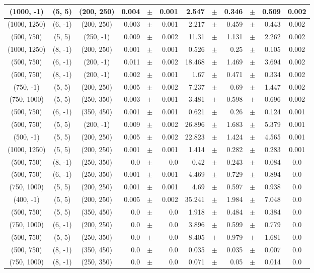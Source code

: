 \documentclass[12pt]{paper}
\begin{document}
\begin{table}[ht]
\begin{center}
{\begin{tabular}{|c|c|c|rrr|rrrrr|c|}
(1000, -1)&(5, 5)&(200, 250)&0.004&$\pm$&0.001&2.547&$\pm$&0.346&$\pm$&0.509&0.002\\\hline
(1000, 1250)&(6, -1)&(200, 250)&0.003&$\pm$&0.001&2.217&$\pm$&0.459&$\pm$&0.443&0.002\\\hline
(500, 750)&(5, 5)&(250, -1)&0.009&$\pm$&0.002&11.31&$\pm$&1.131&$\pm$&2.262&0.002\\\hline
(1000, 1250)&(8, -1)&(200, 250)&0.001&$\pm$&0.001&0.526&$\pm$&0.25&$\pm$&0.105&0.002\\\hline
(500, 750)&(6, -1)&(200, -1)&0.011&$\pm$&0.002&18.468&$\pm$&1.469&$\pm$&3.694&0.002\\\hline
(500, 750)&(8, -1)&(200, -1)&0.002&$\pm$&0.001&1.67&$\pm$&0.471&$\pm$&0.334&0.002\\\hline
(750, -1)&(5, 5)&(200, 250)&0.005&$\pm$&0.002&7.237&$\pm$&0.69&$\pm$&1.447&0.002\\\hline
(750, 1000)&(5, 5)&(250, 350)&0.003&$\pm$&0.001&3.481&$\pm$&0.598&$\pm$&0.696&0.002\\\hline
(500, 750)&(6, -1)&(350, 450)&0.001&$\pm$&0.001&0.621&$\pm$&0.26&$\pm$&0.124&0.001\\\hline
(500, 750)&(5, 5)&(200, -1)&0.009&$\pm$&0.002&26.896&$\pm$&1.683&$\pm$&5.379&0.001\\\hline
(500, -1)&(5, 5)&(200, 250)&0.005&$\pm$&0.002&22.823&$\pm$&1.424&$\pm$&4.565&0.001\\\hline
(1000, 1250)&(5, 5)&(200, 250)&0.001&$\pm$&0.001&1.414&$\pm$&0.282&$\pm$&0.283&0.001\\\hline
(500, 750)&(8, -1)&(250, 350)&0.0&$\pm$&0.0&0.42&$\pm$&0.243&$\pm$&0.084&0.0\\\hline
(500, 750)&(6, -1)&(250, 350)&0.001&$\pm$&0.001&4.469&$\pm$&0.729&$\pm$&0.894&0.0\\\hline
(750, 1000)&(5, 5)&(200, 250)&0.001&$\pm$&0.001&4.69&$\pm$&0.597&$\pm$&0.938&0.0\\\hline
(400, -1)&(5, 5)&(200, 250)&0.005&$\pm$&0.002&35.241&$\pm$&1.984&$\pm$&7.048&0.0\\\hline
(500, 750)&(5, 5)&(350, 450)&0.0&$\pm$&0.0&1.918&$\pm$&0.484&$\pm$&0.384&0.0\\\hline
(750, 1000)&(6, -1)&(200, 250)&0.0&$\pm$&0.0&3.896&$\pm$&0.599&$\pm$&0.779&0.0\\\hline
(500, 750)&(5, 5)&(250, 350)&0.0&$\pm$&0.0&8.405&$\pm$&0.979&$\pm$&1.681&0.0\\\hline
(500, 750)&(8, -1)&(350, 450)&0.0&$\pm$&0.0&0.035&$\pm$&0.035&$\pm$&0.007&0.0\\\hline
(750, 1000)&(8, -1)&(250, 350)&0.0&$\pm$&0.0&0.071&$\pm$&0.05&$\pm$&0.014&0.0\\\hline

\end{tabular}}
\end{center}
\end{table}
\end{document}
